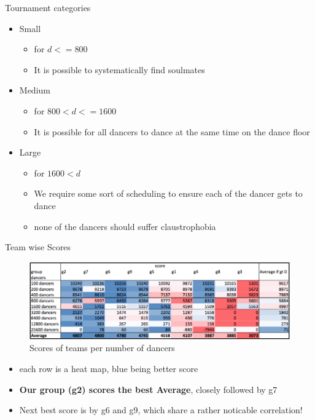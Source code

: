 \begin{frame}{Tournament categories}

\begin{itemize}
\tightlist
\item
  Small

  \begin{itemize}
  \tightlist
  \item
    for \(d<=800\)
  \item
    It is possible to systematically find soulmates
  \end{itemize}
\item
  Medium

  \begin{itemize}
  \tightlist
  \item
    for \(800 < d <=1600\)
  \item
    It is possible for all dancers to dance at the same time on the
    dance floor
  \end{itemize}
\item
  Large

  \begin{itemize}
  \tightlist
  \item
    for \(1600 < d\)
  \item
    We require some sort of scheduling to ensure each of the dancer gets
    to dance
  \item
    none of the dancers should suffer claustrophobia
  \end{itemize}
\end{itemize}

\end{frame}

\begin{frame}{Team wise Scores}

\begin{figure}[htbp]
\centering
\includegraphics{imgs/team-scores.png}
\caption{Scores of teams per number of dancers\label{team-scores}}
\end{figure}

\begin{itemize}
\tightlist
\item
  each row is a heat map, blue being better score
\item
  \textbf{Our group (g2) scores the best Average}, closely followed by
  g7
\item
  Next best score is by g6 and g9, which share a rather noticable
  correlation!
\end{itemize}

\end{frame}

